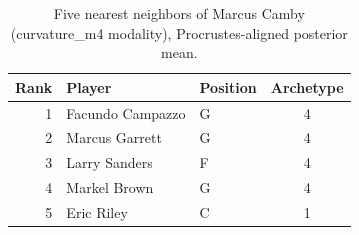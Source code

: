 \begin{table}[htbp]
  \centering\small
  \begin{tabular}{rllc}
    \toprule
    Rank & Player & Position & Archetype \\
    \midrule
    1 & Facundo Campazzo & G & 4 \\
    2 & Marcus Garrett & G & 4 \\
    3 & Larry Sanders & F & 4 \\
    4 & Markel Brown & G & 4 \\
    5 & Eric Riley & C & 1 \\
    \bottomrule
  \end{tabular}
  \caption{Five nearest neighbors of Marcus Camby (curvature_m4 modality), Procrustes-aligned posterior mean.}
  \label{tab:Marcus_Camby_neighbors_curvature_m4}
\end{table}

